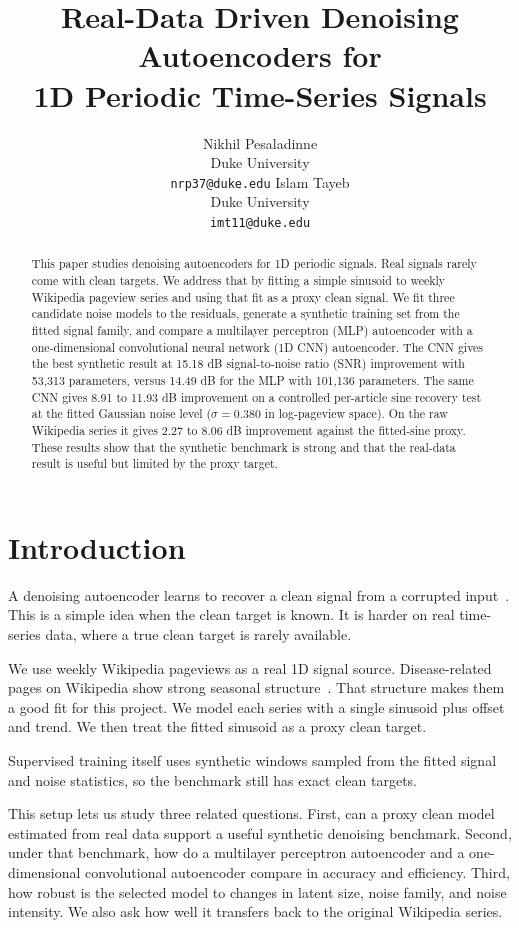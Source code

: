 \documentclass{article}
\title{Real-Data Driven Denoising Autoencoders for \\ 1D Periodic Time-Series Signals}
\author{Nikhil Pesaladinne \\
Duke University \\
\texttt{nrp37@duke.edu}
\And
Islam Tayeb \\
Duke University \\
\texttt{imt11@duke.edu}
}
\begin{document}
\maketitle
{}

\begin{abstract}
This paper studies denoising autoencoders for 1D periodic signals. Real signals rarely come with clean targets. We address that by fitting a simple sinusoid to weekly Wikipedia pageview series and using that fit as a proxy clean signal. We fit three candidate noise models to the residuals, generate a synthetic training set from the fitted signal family, and compare a multilayer perceptron (MLP) autoencoder with a one-dimensional convolutional neural network (1D CNN) autoencoder. The CNN gives the best synthetic result at 15.18 dB signal-to-noise ratio (SNR) improvement with 53{,}313 parameters, versus 14.49 dB for the MLP with 101{,}136 parameters. The same CNN gives 8.91 to 11.93 dB improvement on a controlled per-article sine recovery test at the fitted Gaussian noise level ($\sigma = 0.380$ in log-pageview space). On the raw Wikipedia series it gives 2.27 to 8.06 dB improvement against the fitted-sine proxy. These results show that the synthetic benchmark is strong and that the real-data result is useful but limited by the proxy target.
\end{abstract}

\section{Introduction}

A denoising autoencoder learns to recover a clean signal from a corrupted input~\citep{vincent2008}. This is a simple idea when the clean target is known. It is harder on real time-series data, where a true clean target is rarely available.

We use weekly Wikipedia pageviews as a real 1D signal source. Disease-related pages on Wikipedia show strong seasonal structure~\citep{generous2014}. That structure makes them a good fit for this project. We model each series with a single sinusoid plus offset and trend. We then treat the fitted sinusoid as a proxy clean target.

Supervised training itself uses synthetic windows sampled from the fitted signal and noise statistics, so the benchmark still has exact clean targets.

This setup lets us study three related questions. First, can a proxy clean model estimated from real data support a useful synthetic denoising benchmark. Second, under that benchmark, how do a multilayer perceptron autoencoder and a one-dimensional convolutional autoencoder compare in accuracy and efficiency. Third, how robust is the selected model to changes in latent size, noise family, and noise intensity. We also ask how well it transfers back to the original Wikipedia series.
\end{document}
